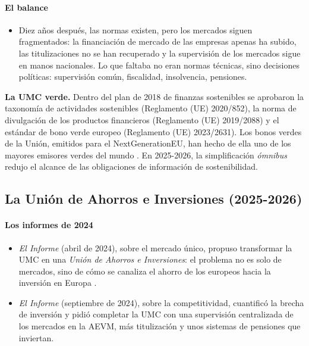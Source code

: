 \documentclass[11pt]{article}
\begin{document}
\paragraph{El balance}

\begin{itemize}
\item Diez años después, las normas existen, pero los mercados siguen fragmentados: la financiación de mercado de las empresas apenas ha subido, las titulizaciones no se han recuperado y la supervisión de los mercados sigue en manos nacionales. Lo que faltaba no eran normas técnicas, sino decisiones políticas: supervisión común, fiscalidad, insolvencia, pensiones.
\end{itemize}

\begin{anotaciones}
\textbf{La UMC verde.} Dentro del plan de 2018 de finanzas sostenibles se aprobaron la taxonomía de actividades sostenibles (Reglamento (UE) 2020/852), la norma de divulgación de los productos financieros (Reglamento (UE) 2019/2088) y el estándar de bono verde europeo (Reglamento (UE) 2023/2631). Los bonos verdes de la Unión, emitidos para el NextGenerationEU, han hecho de ella uno de los mayores emisores verdes del mundo . En 2025-2026, la simplificación \emph{ómnibus} redujo el alcance de las obligaciones de información de sostenibilidad.
\end{anotaciones}

\subsection{La Unión de Ahorros e Inversiones (2025-2026)}\label{sec:uai}

\paragraph{Los informes de 2024}

\begin{itemize}
\item \emph{El Informe } (abril de 2024), sobre el mercado único, propuso transformar la UMC en una \emph{Unión de Ahorros e Inversiones}: el problema no es solo de mercados, sino de cómo se canaliza el ahorro de los europeos hacia la inversión en Europa\nocite{Letta2024Much} .
\item \emph{El Informe } (septiembre de 2024), sobre la competitividad, cuantificó la brecha de inversión y pidió completar la UMC con una supervisión centralizada de los mercados en la AEVM, más titulización y unos sistemas de pensiones que inviertan\nocite{Draghi2024Future}.
\end{itemize}
\end{document}
